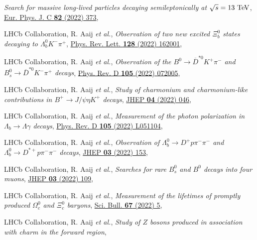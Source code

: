 \begin{cvcontent}
\begin{enumerate}[label={[\arabic*]}, leftmargin=1.5cm]
    \emph{Search for massive long-lived particles decaying semileptonically at $\sqrt{s} = 13~\rm{TeV}$},
    \href{https://doi.org/10.1140/epjc/s10052-022-10186-3}{Eur. Phys. J. C \textbf{82} (2022) 373},
    \item LHCb Collaboration, R. Aaij \emph{et al.}, 
    \emph{Observation of two new excited $\Xi_b^0$ states decaying to  $\Lambda_b^0 K^- \pi^+$},
    \href{https://link.aps.org/doi/10.1103/PhysRevLett.128.162001}{Phys. Rev. Lett. \textbf{128} (2022) 162001},
    \item LHCb Collaboration, R. Aaij \emph{et al.}, 
    \emph{Observation of the $B^0\rightarrow\overline{D}^{*0}K^{+}\pi^{-}$ and $B_s^0\rightarrow\overline{D}^{*0}K^{-}\pi^{+}$ decays},
    \href{https://link.aps.org/doi/10.1103/PhysRevD.105.072005}{Phys. Rev. D \textbf{105} (2022) 072005},
    \item LHCb Collaboration, R. Aaij \emph{et al.},
    \emph{Study of charmonium and charmonium-like contributions in $B^+ \rightarrow J/\psi \eta K^+$ decays},
    \href{https://doi.org/10.1007/JHEP04(2022)046}{JHEP \textbf{04} (2022) 046},
    \item LHCb Collaboration, R. Aaij \emph{et al.}, 
    \emph{Measurement of the photon polarization in $\Lambda_b \to \Lambda \gamma$ decays},
    \href{https://link.aps.org/doi/10.1103/PhysRevD.105.L051104}{Phys. Rev. D \textbf{105} (2022) L051104},
    \item LHCb Collaboration, R. Aaij \emph{et al.}, 
    \emph{Observation of $\Lambda_b^0\rightarrow D^+ p \pi^-\pi^-$ and $\Lambda_b^0\rightarrow D^{*+} p \pi^-\pi^-$ decays},
    \href{https://doi.org/10.1007/JHEP03(2022)153}{JHEP \textbf{03} (2022) 153},
    \item LHCb Collaboration, R. Aaij \emph{et al.}, 
    \emph{Searches for rare $B_s^0$ and $B^0$ decays into four muons},
    \href{https://doi.org/10.1007/JHEP03(2022)109}{JHEP \textbf{03} (2022) 109},
    \item LHCb Collaboration, R. Aaij \emph{et al.}, 
    \emph{Measurement of the lifetimes of promptly produced $\Omega^{0}_{c}$ and $\Xi^{0}_{c}$ baryons},
    \href{https://doi.org/10.1016/j.scib.2021.11.022}{Sci. Bull. \textbf{67} (2022) 5},
    \item LHCb Collaboration, R. Aaij \emph{et al.}, 
    \emph{Study of $Z$ bosons produced in association with charm in the forward region},

\end{enumerate}
\end{cvcontent}
